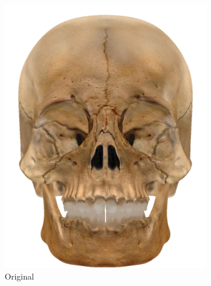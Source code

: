 \begin{figure}
\centering
\begin{subfigure}[b]{0.15\textwidth}
        \includegraphics[width=\textwidth]{img/textures/OriginalSkull.png}
        \caption{Original}
        \label{fig:OriginalSkull}
\end{subfigure}
    ~
    \begin{subfigure}[b]{0.15\textwidth}

\end{subfigure}
\end{figure}
